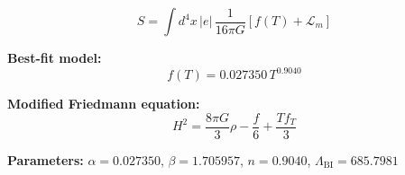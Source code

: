 
\begin{equation}
  S = \int d^4x \, |e| \, \frac{1}{16\pi G} \left[ f(T) + \mathcal{L}_m \right]
\end{equation}

\textbf{Best-fit model:}
\begin{equation}
  f(T) = 0.027350 \, T^{0.9040}
\end{equation}

\textbf{Modified Friedmann equation:}
\begin{equation}
  H^2 = \frac{8\pi G}{3} \rho - \frac{f}{6} + \frac{T f_T}{3}
\end{equation}

\textbf{Parameters:}
$\alpha = 0.027350$, \quad
$\beta = 1.705957$, \quad
$n = 0.9040$, \quad
$\Lambda_{\text{BI}} = 685.7981$